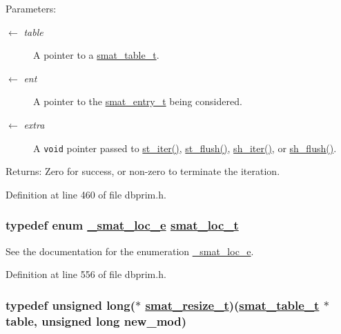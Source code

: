 \begin{Desc}
\item[Parameters:]
\begin{description}
\item[\mbox{$\leftarrow$} {\em table}]A pointer to a \hyperlink{group__dbprim__smat_ga0}{smat\_\-table\_\-t}. \item[\mbox{$\leftarrow$} {\em ent}]A pointer to the \hyperlink{group__dbprim__smat_ga2}{smat\_\-entry\_\-t} being considered. \item[\mbox{$\leftarrow$} {\em extra}]A {\tt void} pointer passed to \hyperlink{group__dbprim__smat_ga14}{st\_\-iter()}, \hyperlink{group__dbprim__smat_ga15}{st\_\-flush()}, \hyperlink{group__dbprim__smat_ga21}{sh\_\-iter()}, or \hyperlink{group__dbprim__smat_ga22}{sh\_\-flush()}.\end{description}
\end{Desc}
\begin{Desc}
\item[Returns:]Zero for success, or non-zero to terminate the iteration.\end{Desc}


Definition at line 460 of file dbprim.h.\hypertarget{group__dbprim__smat_ga6}{
\subsubsection[smat\_\-loc\_\-t]{\setlength{\rightskip}{0pt plus 5cm}typedef enum \hyperlink{group__dbprim__smat_ga70}{\_\-smat\_\-loc\_\-e} \hyperlink{group__dbprim__smat_ga6}{smat\_\-loc\_\-t}}}
\label{group__dbprim__smat_ga6}


See the documentation for the enumeration \hyperlink{group__dbprim__smat_ga70}{\_\-smat\_\-loc\_\-e}.

Definition at line 556 of file dbprim.h.\hypertarget{group__dbprim__smat_ga3}{
\subsubsection[smat\_\-resize\_\-t]{\setlength{\rightskip}{0pt plus 5cm}typedef unsigned long($\ast$ \hyperlink{group__dbprim__smat_ga3}{smat\_\-resize\_\-t})(\hyperlink{struct__smat__table__s}{smat\_\-table\_\-t} $\ast$table, unsigned long new\_\-mod)}}
\label{group__dbprim__smat_ga3}


